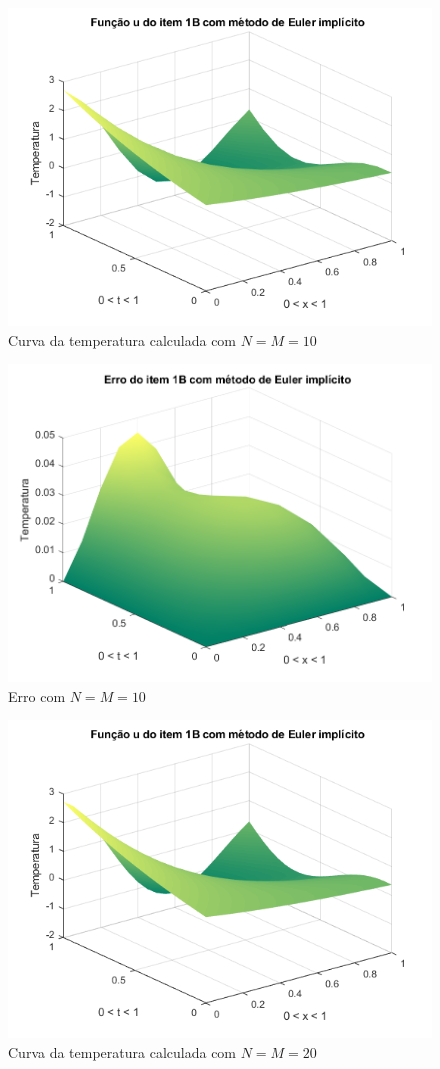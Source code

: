 \documentclass[12pt]{article}
\begin{document}
\begin{spacing}{1.5}
\begin{figure}
    \centering
    \includegraphics[width=0.8\linewidth]{Segunda_Tarefa/ItemB/nm10_calculada_B.png}
    \caption{Curva da temperatura calculada com $N=M=10$}
    \label{fig:BB_nm10_calculada}
\end{figure}

\begin{figure}
    \centering
    \includegraphics[width=0.8\linewidth]{Segunda_Tarefa/ItemB/nm10_erro_B.png}
    \caption{Erro com $N=M=10$}
    \label{fig:BB_nm10_erro}
\end{figure}

\begin{figure}
    \centering
    \includegraphics[width=0.8\linewidth]{Segunda_Tarefa/ItemB/nm20_calculada_B.png}
    \caption{Curva da temperatura calculada com $N=M=20$}
    \label{fig:BB_nm20_calculada}
\end{figure}


\end{spacing}
\end{document}
